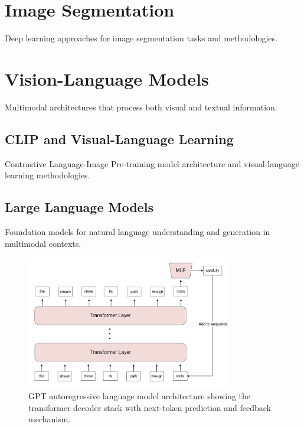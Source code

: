 \section{Image Segmentation}

Deep learning approaches for image segmentation tasks and methodologies.

\section{Vision-Language Models}

Multimodal architectures that process both visual and textual information.

\subsection{CLIP and Visual-Language Learning}

Contrastive Language-Image Pre-training model architecture and visual-language learning methodologies.

\subsection{Large Language Models}

Foundation models for natural language understanding and generation in multimodal contexts.

\begin{figure}[htbp]
\centering
\includegraphics[width=0.8\textwidth]{Images/gpt.png}
\caption{GPT autoregressive language model architecture showing the transformer decoder stack with next-token prediction and feedback mechanism.}
\label{fig:gpt}
\end{figure}